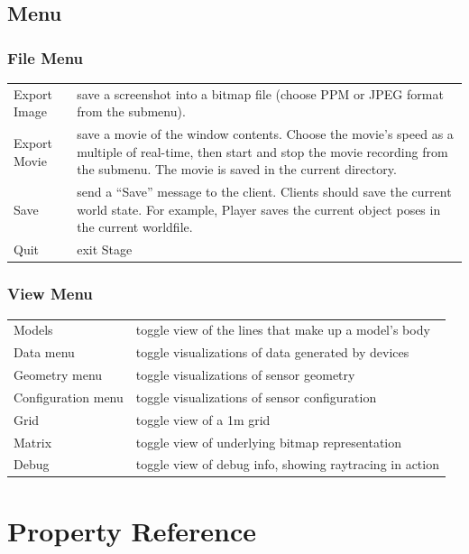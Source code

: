 \documentclass[letter,11pt,twoside]{report}
\begin{document}
\section{Menu}

\subsection{File Menu}

\begin{tabular}{|l|l|}
\hline 

Export Image & save a screenshot into a bitmap file (choose PPM or
JPEG format from the submenu).\\

Export Movie & save a movie of the window contents. Choose the movie's
speed as a multiple of real-time, then start and stop the movie
recording from the submenu. The movie is saved in the current
directory.\\

Save & send a ``Save'' message to the client. Clients should save the
current world state. For example, Player saves the current object
poses in the current worldfile.\\

Quit & exit Stage\\
\hline
\end{tabular}

\subsection{View Menu}

\begin{tabular}{|l|l|}
\hline 
Models & toggle view of the lines that make up a model's body\\
Data menu & toggle visualizations of data generated by devices\\
Geometry menu & toggle visualizations of sensor geometry\\
Configuration menu & toggle visualizations of sensor configuration\\
Grid & toggle view of a 1m grid\\
Matrix & toggle view of underlying bitmap representation\\
Debug & toggle view of debug info, showing raytracing in action\\
\hline
\end{tabular}



\chapter{Property Reference}
\end{document}
